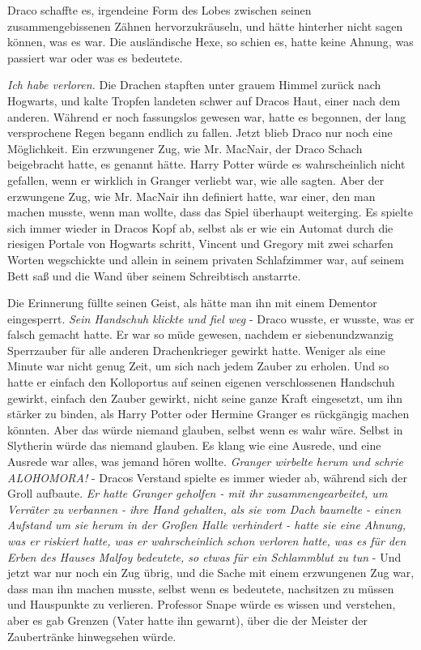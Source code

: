 Draco schaffte es, irgendeine Form des Lobes zwischen seinen zusammengebissenen
Zähnen hervorzukräuseln, und hätte hinterher nicht sagen können, was es war. Die
ausländische Hexe, so schien es, hatte keine Ahnung, was passiert war oder was
es bedeutete.

\emph{Ich habe verloren.} Die Drachen stapften unter grauem Himmel zurück nach
Hogwarts, und kalte Tropfen landeten schwer auf Dracos Haut, einer nach dem
anderen. Während er noch fassungslos gewesen war, hatte es begonnen, der lang
versprochene Regen begann endlich zu fallen. Jetzt blieb Draco nur noch eine
Möglichkeit. Ein erzwungener Zug, wie Mr. MacNair, der Draco Schach beigebracht
hatte, es genannt hätte. Harry Potter würde es wahrscheinlich nicht gefallen,
wenn er wirklich in Granger verliebt war, wie alle sagten. Aber der erzwungene
Zug, wie Mr. MacNair ihn definiert hatte, war einer, den man machen musste, wenn
man wollte, dass das Spiel überhaupt weiterging. Es spielte sich immer wieder in
Dracos Kopf ab, selbst als er wie ein Automat durch die riesigen Portale von
Hogwarts schritt, Vincent und Gregory mit zwei scharfen Worten wegschickte und
allein in seinem privaten Schlafzimmer war, auf seinem Bett saß und die Wand
über seinem Schreibtisch anstarrte.

Die Erinnerung füllte seinen Geist, als hätte man ihn mit einem Dementor
eingesperrt. \emph{Sein Handschuh klickte und fiel weg }- Draco wusste, er
wusste, was er falsch gemacht hatte. Er war so müde gewesen, nachdem er
siebenundzwanzig Sperrzauber für alle anderen Drachenkrieger gewirkt hatte.
Weniger als eine Minute war nicht genug Zeit, um sich nach jedem Zauber zu
erholen. Und so hatte er einfach den Kolloportus auf seinen eigenen
verschlossenen Handschuh gewirkt, einfach den Zauber gewirkt, nicht seine ganze
Kraft eingesetzt, um ihn stärker zu binden, als Harry Potter oder Hermine
Granger es rückgängig machen könnten. Aber das würde niemand glauben, selbst
wenn es wahr wäre. Selbst in Slytherin würde das niemand glauben. Es klang wie
eine Ausrede, und eine Ausrede war alles, was jemand hören wollte. \emph{Granger
wirbelte herum und schrie \glqq ALOHOMORA!\grqq{} } - Dracos Verstand spielte es
immer wieder ab, während sich der Groll aufbaute. \emph{Er hatte Granger
geholfen - mit ihr zusammengearbeitet, um Verräter zu verbannen - ihre Hand
gehalten, als sie vom Dach baumelte - einen Aufstand um sie herum in der Großen
Halle verhindert - hatte sie eine Ahnung, was er riskiert hatte, was er
wahrscheinlich schon verloren hatte, was es für den Erben des Hauses Malfoy
bedeutete, so etwas }\emph{für ein Schlammblut zu tun }- Und jetzt war nur noch
ein Zug übrig, und die Sache mit einem erzwungenen Zug war, dass man ihn machen
musste, selbst wenn es bedeutete, nachsitzen zu müssen und Hauspunkte zu
verlieren. Professor Snape würde es wissen und verstehen, aber es gab Grenzen
(Vater hatte ihn gewarnt), über die der Meister der Zaubertränke hinwegsehen
würde.

